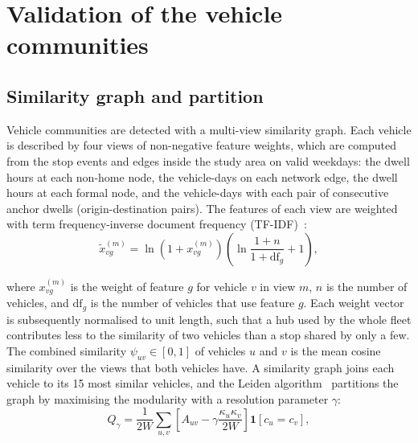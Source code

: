 \section{Validation of the vehicle communities}
\label{app:communities}


\subsection{Similarity graph and partition}

Vehicle communities are detected with a multi-view similarity graph. Each vehicle is described by four views of non-negative feature weights, which are computed from the stop events and edges inside the study area on valid weekdays: the dwell hours at each non-home node, the vehicle-days on each network edge, the dwell hours at each formal node, and the vehicle-days with each pair of consecutive anchor dwells (origin-destination pairs). The features of each view are weighted with term frequency-inverse document frequency (TF-IDF)~\cite{salton1988_term_weighting}:
\begin{equation}
    \tilde{x}^{(m)}_{vg} = \ln\left(1 + x^{(m)}_{vg}\right)\left(\ln\frac{1 + n}{1 + \mathrm{df}_g} + 1\right),
\end{equation}

\noindent where \( x^{(m)}_{vg} \) is the weight of feature \( g \) for vehicle \( v \) in view \( m \), \( n \) is the number of vehicles, and \( \mathrm{df}_g \) is the number of vehicles that use feature \( g \). Each weight vector is subsequently normalised to unit length, such that a hub used by the whole fleet contributes less to the similarity of two vehicles than a stop shared by only a few. The combined similarity \( \psi_{uv} \in [0, 1] \) of vehicles \( u \) and \( v \) is the mean cosine similarity over the views that both vehicles have. A similarity graph joins each vehicle to its 15 most similar vehicles, and the Leiden algorithm~\cite{traag2019_louvain_to_leiden} partitions the graph by maximising the modularity with a resolution parameter \( \gamma \):
\begin{equation}
    Q_\gamma = \frac{1}{2W} \sum_{u,v} \left[ A_{uv} - \gamma \frac{\kappa_u \kappa_v}{2W} \right] \mathbf{1}\left[c_u = c_v\right],
\end{equation}

